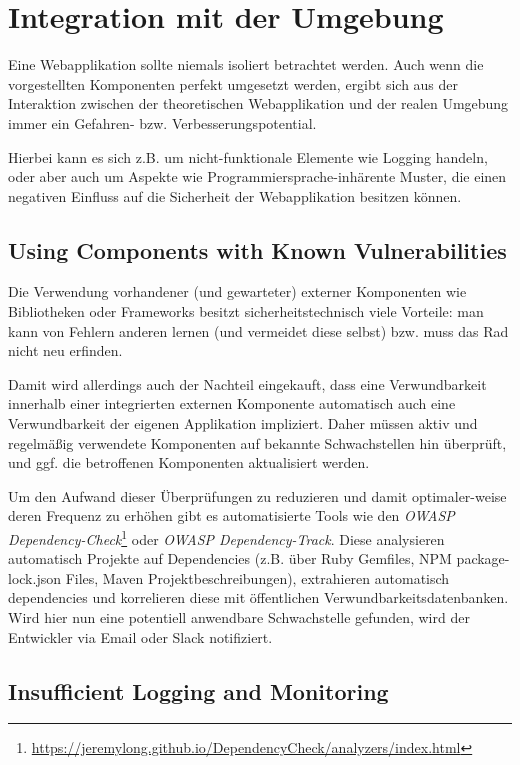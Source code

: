 \chapter{Integration mit der Umgebung}

Eine Webapplikation sollte niemals isoliert betrachtet werden. Auch wenn die vorgestellten Komponenten perfekt umgesetzt werden, ergibt sich aus der Interaktion zwischen der theoretischen Webapplikation und der realen Umgebung immer ein Gefahren- bzw. Verbesserungspotential.

Hierbei kann es sich z.B. um nicht-funktionale Elemente wie Logging handeln, oder aber auch um Aspekte wie Programmiersprache-inhärente Muster, die einen negativen Einfluss auf die Sicherheit der Webapplikation besitzen können.

\section{Using Components with Known Vulnerabilities}

Die Verwendung vorhandener (und gewarteter) externer Komponenten wie Bibliotheken oder Frameworks besitzt sicherheitstechnisch viele Vorteile: man kann von Fehlern anderen lernen (und vermeidet diese selbst) bzw. muss das Rad nicht neu erfinden.

Damit wird allerdings auch der Nachteil eingekauft, dass eine Verwundbarkeit innerhalb einer integrierten externen Komponente automatisch auch eine Verwundbarkeit der eigenen Applikation impliziert. Daher müssen aktiv und regelmäßig verwendete Komponenten auf bekannte Schwachstellen hin überprüft, und ggf. die betroffenen Komponenten aktualisiert werden.

Um den Aufwand dieser Überprüfungen zu reduzieren und damit optimaler-weise deren Frequenz zu erhöhen gibt es automatisierte Tools wie den \textit{OWASP Dependency-Check}\footnote{\url{https://jeremylong.github.io/DependencyCheck/analyzers/index.html}} oder \textit{OWASP Dependency-Track}. Diese analysieren automatisch Projekte auf Dependencies (z.B. über Ruby Gemfiles, NPM package-lock.json Files, Maven Projektbeschreibungen), extrahieren automatisch dependencies und korrelieren diese mit öffentlichen Verwundbarkeitsdatenbanken. Wird hier nun eine potentiell anwendbare Schwachstelle gefunden, wird der Entwickler via Email oder Slack notifiziert.

\section{Insufficient Logging and Monitoring}


